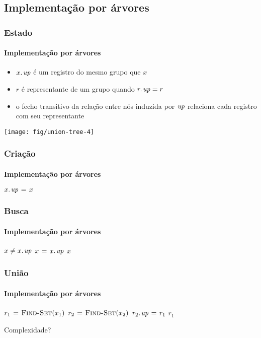 \documentclass{beamer}
\begin{document}
\subsection{Implementação por árvores}

\begin{frame}
\frametitle{Estado}
\framesubtitle{Implementação por árvores}

\begin{itemize}
\item $\attrib{x}{up}$ é um registro do mesmo grupo que $x$
\item $r$ é representante de um grupo quando $\attrib{r}{up} = r$
\item o fecho transitivo da relação entre nós induzida por $\id{up}$ 
 relaciona cada registro com seu representante
\end{itemize}
\pause
\begin{center}
\texttt{[image: fig/union-tree-4]}
\end{center}

\end{frame}

\begin{frame}
\frametitle{Criação}
\framesubtitle{Implementação por árvores}

\begin{codebox}
\li $\attrib{x}{up} \gets x$
\end{codebox}

\end{frame}

\begin{frame}
\frametitle{Busca}
\framesubtitle{Implementação por árvores}

\begin{codebox}
\li \While $x \neq \attrib{x}{up}$
\li \Do $x \gets \attrib{x}{up}$
    \End
\li \Return $x$
\end{codebox}

\end{frame}

\begin{frame}
\frametitle{União}
\framesubtitle{Implementação por árvores}

\begin{codebox}
\li $r_1 \mathrel{\hspace{1pt}=\hspace{1pt}} \textnormal{\scshape Find-Set}(x_1)$
\li $r_2 \mathrel{\hspace{1pt}=\hspace{1pt}} \textnormal{\scshape Find-Set}(x_2)$
\li $\attrib{r_2}{up} \gets r_1$
\li \Return $r_1$
\end{codebox}
\pause
\alert{Complexidade?}
\end{frame}
\end{document}
